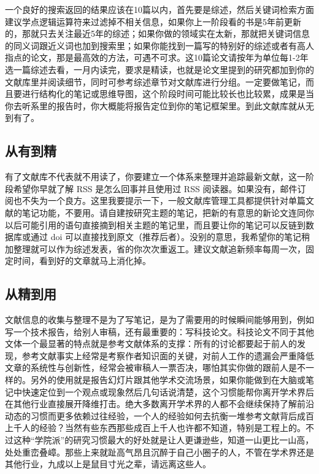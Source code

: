 \documentclass[]{tufte-book}
\begin{document}
一个良好的搜索返回的结果应该在10篇以内，首先要是综述，然后关键词检索方面建议学点逻辑运算符来过滤掉不相关信息，如果你上一阶段看的书是5年前更新的，那就只去关注最近5年的综述；如果你做的领域实在太新，那就把关键词信息的同义词跟近义词也加到搜索里；如果你能找到一篇写的特别好的综述或者有高人指点的论文，那是最高效的方法，可遇不可求。这10篇论文请按年为单位每1-2年选一篇综述去看，一月内读完，要求是精读，也就是论文里提到的研究都加到你的文献库里并阅读细节，同时可参考综述章节对文献库进行分组。一定要做笔记，而且要进行结构化的笔记或思维导图，这个阶段时间可能比较长也比较累，成果是当你去听系里的报告时，你大概能将报告定位到你的笔记框架里。到此文献库就从无到有了。

\hypertarget{ux4eceux6709ux5230ux7cbe}{%
\subsection{从有到精}\label{ux4eceux6709ux5230ux7cbe}}

有了文献库不代表就不用读了，你要建立一个体系来整理并追踪最新文献，这一阶段希望你早就了解 RSS 是怎么回事并且使用过 RSS 阅读器。如果没有，邮件订阅也不失为一个良方。这里我要提示一下，一般文献库管理工具都提供针对单篇文献的笔记功能，不要用。请自建按研究主题的笔记，把新的有意思的新论文连同你以后可能引用的语句直接摘到相关主题的笔记里，而且要让你的笔记可以反链到数据库或通过 doi 可以直接找到原文（推荐后者）。没别的意思，我希望你的笔记稍加整理就可以作为综述发表，省的你次次重返工。建议文献追新频率每周一次，固定时间，看到好的文章就马上消化掉。

\hypertarget{ux4eceux7cbeux5230ux7528}{%
\subsection{从精到用}\label{ux4eceux7cbeux5230ux7528}}

文献信息的收集与整理不是为了写笔记，是为了需要用的时候瞬间能够用到，例如写一个技术报告，给别人审稿，还有最重要的：写科技论文。科技论文不同于其他文体一个最显著的特点就是参考文献体系的支撑：所有的讨论都要起于前人的发现，参考文献事实上经常是考察作者知识面的关键，对前人工作的遗漏会严重降低文章的系统性与创新性，经常会被审稿人一票否决，哪怕其实你做的跟前人是不一样的。另外的使用就是报告幻灯片跟其他学术交流场景，如果你能做到在大脑或笔记中快速定位到一个观点或现象然后几句话说清楚，这个习惯能帮你离开学术界后在其他行业直接展开降维打击。绝大多数离开学术界的人都不会继续保持了解前沿动态的习惯而更多依赖过往经验，一个人的经验如何去抗衡一堆参考文献背后成百上千人的经验？当然有些东西那些成百上千人也许都不知道，特别是工程上的。不过这种``学院派''的研究习惯最大的好处就是让人更谦逊些，知道一山更比一山高，处处重峦叠嶂。那些上来就趾高气昂且沉醉于自己小圈子的人，不管在学术界还是其他行业，九成以上是鼠目寸光之辈，请远离这些人。
\end{document}
